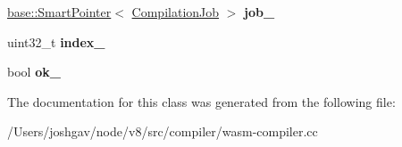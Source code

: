 \begin{DoxyCompactItemize}
\item 
\hyperlink{classv8_1_1base_1_1_smart_pointer}{base\+::\+Smart\+Pointer}$<$ \hyperlink{classv8_1_1internal_1_1_compilation_job}{Compilation\+Job} $>$ {\bfseries job\+\_\+}\hypertarget{classv8_1_1internal_1_1compiler_1_1_wasm_compilation_unit_a7cef19ba5ccd3c4a36fc94f97b5418c0}{}\label{classv8_1_1internal_1_1compiler_1_1_wasm_compilation_unit_a7cef19ba5ccd3c4a36fc94f97b5418c0}

\item 
uint32\+\_\+t {\bfseries index\+\_\+}\hypertarget{classv8_1_1internal_1_1compiler_1_1_wasm_compilation_unit_a532873be3adfe70235e7edc04a0bc3fe}{}\label{classv8_1_1internal_1_1compiler_1_1_wasm_compilation_unit_a532873be3adfe70235e7edc04a0bc3fe}

\item 
bool {\bfseries ok\+\_\+}\hypertarget{classv8_1_1internal_1_1compiler_1_1_wasm_compilation_unit_ae535efe34a5e0a31f990602a74e67fa0}{}\label{classv8_1_1internal_1_1compiler_1_1_wasm_compilation_unit_ae535efe34a5e0a31f990602a74e67fa0}

\end{DoxyCompactItemize}


The documentation for this class was generated from the following file\+:\begin{DoxyCompactItemize}
\item 
/\+Users/joshgav/node/v8/src/compiler/wasm-\/compiler.\+cc\end{DoxyCompactItemize}
